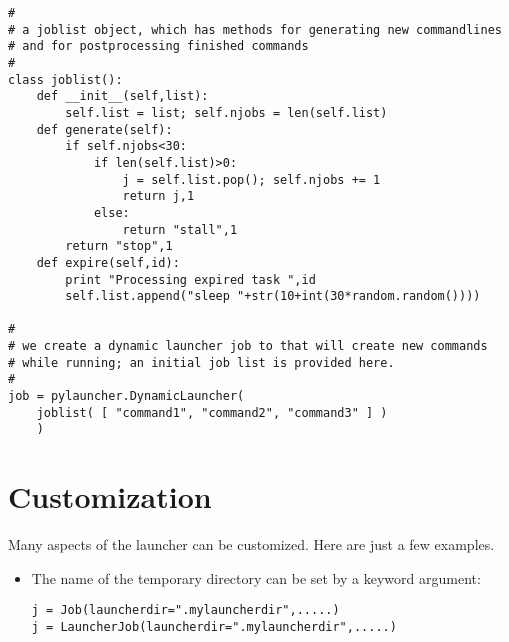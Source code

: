 \documentclass[11pt]{artikel3}
\begin{document}
\begin{verbatim}
#
# a joblist object, which has methods for generating new commandlines
# and for postprocessing finished commands
#
class joblist():
    def __init__(self,list):
        self.list = list; self.njobs = len(self.list)
    def generate(self):
        if self.njobs<30:
            if len(self.list)>0:
                j = self.list.pop(); self.njobs += 1
                return j,1
            else:
                return "stall",1
        return "stop",1
    def expire(self,id):
        print "Processing expired task ",id
        self.list.append("sleep "+str(10+int(30*random.random())))

#
# we create a dynamic launcher job to that will create new commands
# while running; an initial job list is provided here.
#
job = pylauncher.DynamicLauncher(
    joblist( [ "command1", "command2", "command3" ] )
    )
\end{verbatim}

\section{Customization}

Many aspects of the launcher can be customized. Here are just a few examples.
\begin{itemize}
  \item The name of the temporary directory can be set by a keyword argument:
    \begin{verbatim}
j = Job(launcherdir=".mylauncherdir",.....)
j = LauncherJob(launcherdir=".mylauncherdir",.....)
    \end{verbatim}
\end{itemize}
\end{document}
